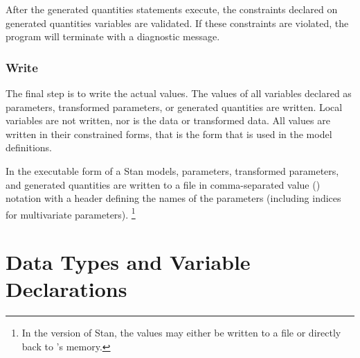 After the generated quantities statements execute, the constraints
declared on generated quantities variables are validated.   If these
constraints are violated, the program will terminate with a diagnostic message.

\subsection{Write}

The final step is to write the actual values.  The values of all
variables declared as parameters, transformed parameters, or generated
quantities are written.  Local variables are not written, nor is the
data or transformed data.  All values are written in their constrained
forms, that is the form that is used in the model definitions.

In the executable form of a Stan models, parameters, transformed
parameters, and generated quantities are written to a file in
comma-separated value () notation with a header defining
the names of the parameters (including indices for multivariate
parameters).%
\footnote{In the \R version of Stan, the values may either be
written to a  file or directly back to \R's memory.}




\chapter{Data Types and Variable Declarations}\label{data-types.chapter}

